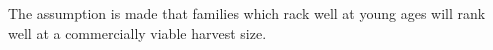 The assumption is made that families which rack well at young ages will rank
well at a commercially viable harvest size.